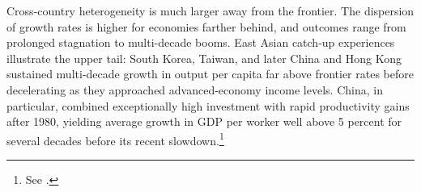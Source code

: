 \documentclass[\topdir/lecture\_notes.tex]{subfiles}
\begin{document}
Cross-country heterogeneity is much larger away from the frontier.
The dispersion of growth rates is higher for economies farther behind, and outcomes range from prolonged stagnation to multi-decade booms.
East Asian catch-up experiences illustrate the upper tail: South Korea, Taiwan, and later China and Hong Kong sustained multi-decade growth in output per capita far above frontier rates before decelerating as they approached advanced-economy income levels.
China, in particular, combined exceptionally high investment with rapid productivity gains after 1980, yielding average growth in GDP per worker well above 5 percent for several decades before its recent slowdown.\footnote{See \parencite{barrosalaimartin2003,jones2016facts,jones2010new,pritchett1997divergence,young1995tyranny,collinsbosworth1996,eastasianmiracle1993,feenstrainklaartimmer2015pwt,worldbankwdi}.}

\end{document}
